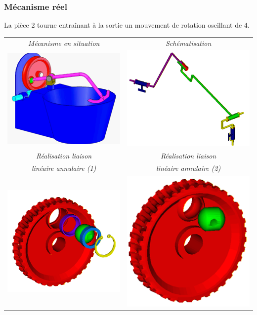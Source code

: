 \documentclass[10pt,fleqn]{article} %
\begin{document}
\begin{multicols}{2}
\subsubsection*{Mécanisme réel}
La pièce 2 tourne entraînant à la sortie un mouvement de rotation oscillant de 4.
\begin{tabular}{cc}
\textit{Mécanisme en situation} & \textit{Schématisation} \\
\includegraphics[width=.4\linewidth]{images/Fig08_01} & 
\includegraphics[width=.4\linewidth]{images/Fig08_02} \\
\textit{Réalisation liaison} & \textit{Réalisation liaison} \\
\textit{linéaire annulaire (1)} & \textit{linéaire annulaire (2)} \\
\includegraphics[width=.4\linewidth]{images/Fig08_03} & 
\includegraphics[width=.4\linewidth]{images/Fig08_04} \\
\end{tabular}


\end{multicols}
\end{document}
